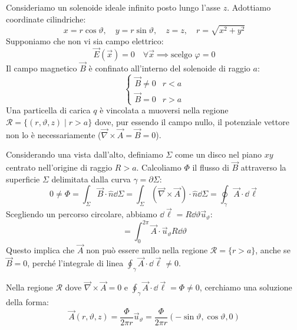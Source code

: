 Consideriamo un solenoide ideale infinito posto lungo l'asse \( z \). Adottiamo coordinate cilindriche:
\[
    x = r \cos \vartheta, \quad y = r \sin \vartheta, \quad z=z, \quad r = \sqrt{x^2+y^2}
\]
Supponiamo che non vi sia campo elettrico:
\[
    \vec{E}(\vec{x}) = 0 \quad \forall \vec{x} \implies \text{scelgo } \varphi = 0
\]
Il campo magnetico \( \vec{B} \) è confinato all'interno del solenoide di raggio \( a \):
\[
    \begin{cases}
        \vec{B} \neq 0 & r < a \\
        \vec{B} = 0 & r > a
    \end{cases}
\]
Una particella di carica \( q \) è vincolata a muoversi nella regione \( \mathcal{R} = \{ (r, \vartheta, z) \mid r > a \} \) dove, pur essendo il campo nullo, 
il potenziale vettore non lo è necessariamente (\( \vec{\nabla} \times \vec{A} = \vec{B} = 0 \)).

Considerando una vista dall'alto, definiamo \( \Sigma \) come un disco nel piano \( xy \) centrato nell'origine di raggio \( R > a \).
Calcoliamo \( \Phi \) il flusso di \( \vec{B} \) attraverso la superficie \( \Sigma \) delimitata dalla curva \( \gamma = \partial \Sigma \):
\[
    0 \neq \Phi = \int_{\Sigma} \vec{B} \cdot \hat{n} \dd{\Sigma} = \int_{\Sigma} (\vec{\nabla} \times \vec{A}) \cdot \hat{n} \dd{\Sigma} = \oint_{\gamma} \vec{A} \cdot \dd{\vec{\ell}}
\]
Scegliendo un percorso circolare, abbiamo \( \dd{\vec{\ell}} = R \dd{\vartheta} \vec{u}_\vartheta \):
\[
    = \int_0^{2\pi} \vec{A} \cdot \vec{u}_\vartheta R \dd{\vartheta}
\]
Questo implica che \( \vec{A} \) non può essere nullo nella regione \( \mathcal{R} = \{ r > a \} \), anche se \( \vec{B} = 0 \), perché l'integrale di linea \( \oint_\gamma \vec{A} \cdot \dd{\vec{\ell}} \neq 0 \).

Nella regione \( \mathcal{R} \) dove \( \vec{\nabla} \times \vec{A} = 0 \) e \( \oint_\gamma \vec{A} \cdot \dd{\vec{\ell}} = \Phi \neq 0 \), cerchiamo una soluzione della forma:
\[
    \vec{A}(r, \vartheta, z) = \frac{\Phi}{2\pi r} \vec{u}_\vartheta = \frac{\Phi}{2\pi r} (-\sin\vartheta, \cos\vartheta, 0)
\]

